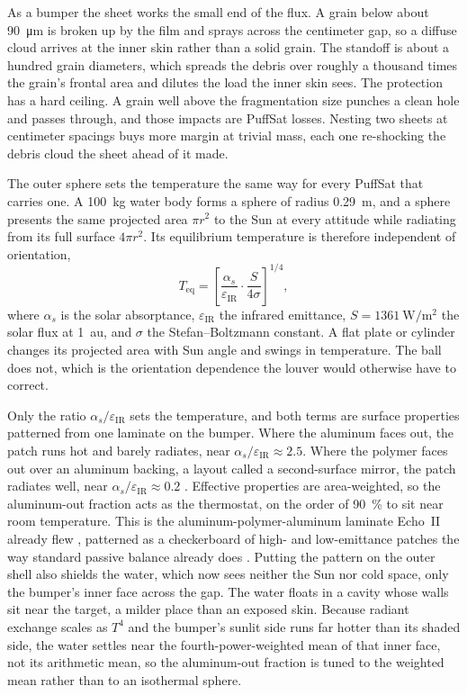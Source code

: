 \documentclass{article}
\begin{document}
As a bumper the sheet works the small end of the flux. A grain below about \SI{90}{\micro\meter} is broken up by the film and sprays across the centimeter gap, so a diffuse cloud arrives at the inner skin rather than a solid grain. The standoff is about a hundred grain diameters, which spreads the debris over roughly a thousand times the grain's frontal area and dilutes the load the inner skin sees. The protection has a hard ceiling. A grain well above the fragmentation size punches a clean hole and passes through, and those impacts are PuffSat losses. Nesting two sheets at centimeter spacings buys more margin at trivial mass, each one re-shocking the debris cloud the sheet ahead of it made.

The outer sphere sets the temperature the same way for every PuffSat that carries one. A \SI{100}{\kilo\gram} water body forms a sphere of radius \SI{0.29}{\meter}, and a sphere presents the same projected area \(\pi r^2\) to the Sun at every attitude while radiating from its full surface \(4\pi r^2\). Its equilibrium temperature is therefore independent of orientation,
\[
T_\mathrm{eq}=\left[\frac{\alpha_s}{\varepsilon_\mathrm{IR}}\cdot\frac{S}{4\sigma}\right]^{1/4},
\]
where \(\alpha_s\) is the solar absorptance, \(\varepsilon_\mathrm{IR}\) the infrared emittance, \(S=\SI{1361}{\watt\per\square\meter}\) the solar flux at \SI{1}{\astronomicalunit}, and \(\sigma\) the Stefan--Boltzmann constant. A flat plate or cylinder changes its projected area with Sun angle and swings in temperature. The ball does not, which is the orientation dependence the louver would otherwise have to correct.

Only the ratio \(\alpha_s/\varepsilon_\mathrm{IR}\) sets the temperature, and both terms are surface properties patterned from one laminate on the bumper. Where the aluminum faces out, the patch runs hot and barely radiates, near \(\alpha_s/\varepsilon_\mathrm{IR}\approx2.5\). Where the polymer faces out over an aluminum backing, a layout called a second-surface mirror, the patch radiates well, near \(\alpha_s/\varepsilon_\mathrm{IR}\approx0.2\) \cite{gilmore2002spacecraft}. Effective properties are area-weighted, so the aluminum-out fraction acts as the thermostat, on the order of \SI{90}{\percent} to sit near room temperature. This is the aluminum-polymer-aluminum laminate Echo~II already flew \cite{nasa_echo_ii_1966}, patterned as a checkerboard of high- and low-emittance patches the way standard passive balance already does \cite{gilmore2002spacecraft}. Putting the pattern on the outer shell also shields the water, which now sees neither the Sun nor cold space, only the bumper's inner face across the gap. The water floats in a cavity whose walls sit near the target, a milder place than an exposed skin. Because radiant exchange scales as \(T^4\) and the bumper's sunlit side runs far hotter than its shaded side, the water settles near the fourth-power-weighted mean of that inner face, not its arithmetic mean, so the aluminum-out fraction is tuned to the weighted mean rather than to an isothermal sphere.
\end{document}
